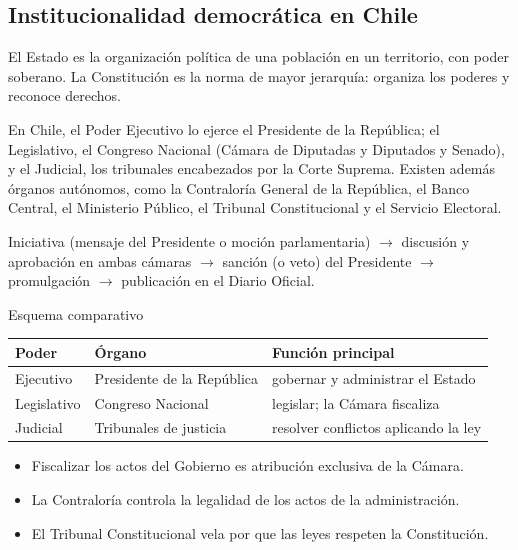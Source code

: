 \documentclass[10pt,a4paper,twocolumn]{article}
\begin{document}
\subsection{Institucionalidad democrática en Chile}

El Estado es la organización política de una población en un territorio, con poder soberano. La Constitución es la norma de mayor jerarquía: organiza los poderes y reconoce derechos.

En Chile, el Poder Ejecutivo lo ejerce el Presidente de la República; el Legislativo, el Congreso Nacional (Cámara de Diputadas y Diputados y Senado), y el Judicial, los tribunales encabezados por la Corte Suprema. Existen además órganos autónomos, como la Contraloría General de la República, el Banco Central, el Ministerio Público, el Tribunal Constitucional y el Servicio Electoral.

\begin{mecanismo}
Iniciativa (mensaje del Presidente o moción parlamentaria) $\rightarrow$ discusión y aprobación en ambas cámaras $\rightarrow$ sanción (o veto) del Presidente $\rightarrow$ promulgación $\rightarrow$ publicación en el Diario Oficial.
\end{mecanismo}

{\sffamily\footnotesize\color{zinc500} Esquema comparativo}
\begin{center}\small
\begin{tabular}{@{}>{\raggedright\arraybackslash}p{\dimexpr(\linewidth-4\tabcolsep)/3\relax}>{\raggedright\arraybackslash}p{\dimexpr(\linewidth-4\tabcolsep)/3\relax}>{\raggedright\arraybackslash}p{\dimexpr(\linewidth-4\tabcolsep)/3\relax}@{}}
\toprule
\textbf{Poder} & \textbf{Órgano} & \textbf{Función principal} \\
\midrule
Ejecutivo & Presidente de la República & gobernar y administrar el Estado \\
Legislativo & Congreso Nacional & legislar; la Cámara fiscaliza \\
Judicial & Tribunales de justicia & resolver conflictos aplicando la ley \\
\bottomrule
\end{tabular}
\end{center}

\begin{ideasclave}
\begin{itemize}
  \item Fiscalizar los actos del Gobierno es atribución exclusiva de la Cámara.
  \item La Contraloría controla la legalidad de los actos de la administración.
  \item El Tribunal Constitucional vela por que las leyes respeten la Constitución.
\end{itemize}
\end{ideasclave}
\end{document}
